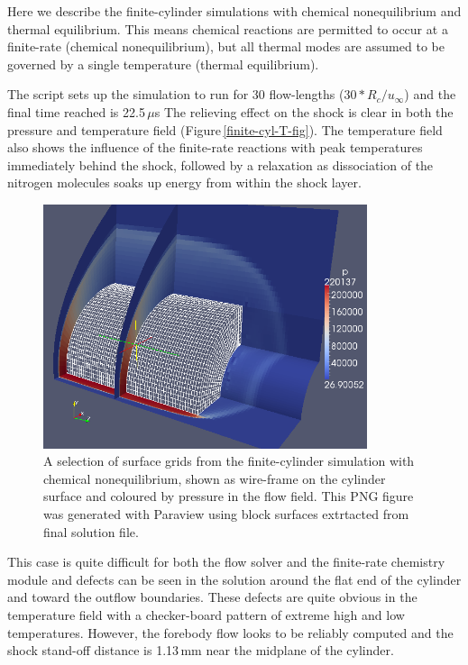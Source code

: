 \medskip
Here we describe the finite-cylinder simulations with chemical nonequilibrium and thermal equilibrium.
This means chemical reactions are permitted to occur at a finite-rate (chemical nonequilibrium), but all thermal modes 
are assumed to be governed by a single temperature (thermal equilibrium).

\medskip
The script sets up the simulation to run for 30 flow-lengths ($30 * R_c / u_{\infty}$)
and the final time reached is 22.5\,$\mu$s
The relieving effect on the shock is clear in both the pressure and temperature field (Figure\,\ref{finite-cyl-T-fig}).
The temperature field also shows the influence of the finite-rate reactions with peak temperatures immediately
behind the shock, followed by a relaxation as dissociation of the nitrogen molecules soaks up energy from within the 
shock layer.
 
\begin{figure}[htbp]
\begin{center}
\includegraphics[width=9.5cm]{../3D/finite-cylinder/thermal-eq/finite-cyl-p-with-mesh-aug2010.png}
\end{center}
\caption{A selection of surface grids from the finite-cylinder simulation with chemical nonequilibrium, 
   shown as wire-frame on the cylinder surface
   and coloured by pressure in the flow field.
   This PNG figure was generated with Paraview using block surfaces extrtacted from final solution file.}
\label{finite-cyl-p-fig}
\end{figure}

\medskip
This case is quite difficult for both the flow solver and the finite-rate chemistry module
and defects can be seen in the solution around the flat end of the cylinder and toward the
outflow boundaries.
These defects are quite obvious in the temperature field with a checker-board pattern of
extreme high and low temperatures.
However, the forebody flow looks to be reliably computed and the shock stand-off distance is
1.13\,mm near the midplane of the cylinder.

